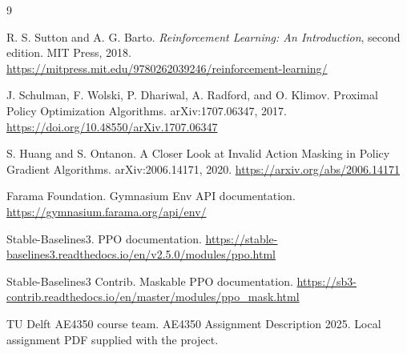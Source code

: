 \documentclass[10pt,a4paper]{article}
\begin{document}
\begin{thebibliography}{9}

R. S. Sutton and A. G. Barto.
\newblock \textit{Reinforcement Learning: An Introduction}, second edition.
\newblock MIT Press, 2018.
\newblock \url{https://mitpress.mit.edu/9780262039246/reinforcement-learning/}

J. Schulman, F. Wolski, P. Dhariwal, A. Radford, and O. Klimov.
\newblock Proximal Policy Optimization Algorithms.
\newblock arXiv:1707.06347, 2017.
\newblock \url{https://doi.org/10.48550/arXiv.1707.06347}

S. Huang and S. Ontanon.
\newblock A Closer Look at Invalid Action Masking in Policy Gradient Algorithms.
\newblock arXiv:2006.14171, 2020.
\newblock \url{https://arxiv.org/abs/2006.14171}

Farama Foundation.
\newblock Gymnasium Env API documentation.
\newblock \url{https://gymnasium.farama.org/api/env/}

Stable-Baselines3.
\newblock PPO documentation.
\newblock \url{https://stable-baselines3.readthedocs.io/en/v2.5.0/modules/ppo.html}

Stable-Baselines3 Contrib.
\newblock Maskable PPO documentation.
\newblock \url{https://sb3-contrib.readthedocs.io/en/master/modules/ppo_mask.html}

TU Delft AE4350 course team.
\newblock AE4350 Assignment Description 2025.
\newblock Local assignment PDF supplied with the project.

\end{thebibliography}
\end{document}
